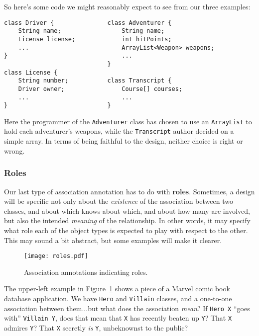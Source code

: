So here's some code we might reasonably expect to see from our three examples:

\begin{Verbatim}[fontsize=\small,samepage=true,frame=single]
class Driver {               class Adventurer {
    String name;                 String name;
    License license;             int hitPoints;
    ...                          ArrayList<Weapon> weapons;
}                                ...
                             }
class License {
    String number;           class Transcript {
    Driver owner;                Course[] courses;
    ...                          ...
}                            }
\end{Verbatim}

Here the programmer of the \texttt{Adventurer} class has chosen to use an
\texttt{ArrayList} to hold each adventurer's weapons, while the
\texttt{Transcript} author decided on a simple array. In terms of being
faithful to the design, neither choice is right or wrong.

\subsubsection{Roles}

Our last type of association annotation has to do with \textbf{roles}.
Sometimes, a design will be specific not only about the \textit{existence} of
the association between two classes, and about which-knows-about-which, and
about how-many-are-involved, but also the intended \textit{meaning} of the
relationship. In other words, it may specify what role each of the object
types is expected to play with respect to the other. This may sound a bit
abstract, but some examples will make it clearer.

\begin{figure}[ht]
\centering
\texttt{[image: roles.pdf]}   %
\caption{Association annotations indicating roles.}
\label{fig:roles}
\end{figure}

The upper-left example in Figure~\ref{fig:roles} shows a piece of a Marvel
comic book database application. We have \texttt{Hero} and \texttt{Villain}
classes, and a one-to-one association between them...but what does the
association \textit{mean}? If \texttt{Hero X} ``goes with'' \texttt{Villain Y},
does that mean that \texttt{X} has recently beaten up \texttt{Y}? That
\texttt{X} admires \texttt{Y}? That \texttt{X} secretly \textit{is}
\texttt{Y}, unbeknownst to the public?

